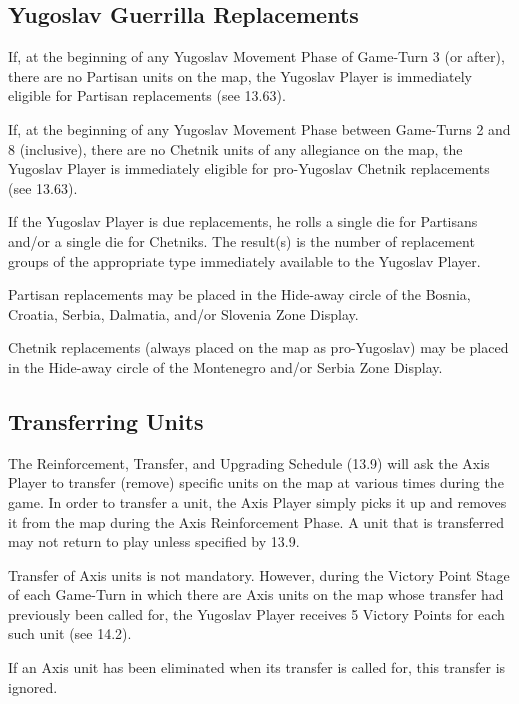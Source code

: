 \subsection{Yugoslav Guerrilla Replacements}\label{sec:13.6}

 If, at the beginning of any Yugoslav Movement Phase of Game-Turn 3 (or after), there are no Partisan units on the map, the Yugoslav Player is immediately eligible for Partisan replacements (see 13.63).

 If, at the beginning of any Yugoslav Movement Phase between Game-Turns 2 and 8 (inclusive), there are no Chetnik units of any allegiance on the map, the Yugoslav Player is immediately eligible for pro-Yugoslav Chetnik replacements (see 13.63).

 If the Yugoslav Player is due replacements, he rolls a single die for Partisans and/or a single die for Chetniks. The result(s) is the number of replacement groups of the appropriate type immediately available to the Yugoslav Player.

 Partisan replacements may be placed in the Hide-away circle of the
Bosnia, Croatia, Serbia, Dalmatia, and/or Slovenia Zone Display.

Chetnik replacements (always placed on the map as pro-Yugoslav) may be placed in the Hide-away circle of the Montenegro and/or Serbia Zone Display.

\subsection{Transferring Units}\label{sec:13.7}

 The Reinforcement, Transfer, and Upgrading Schedule (13.9) will ask the Axis Player to transfer (remove) specific units on the map at various times during the game. In order to transfer a unit, the Axis Player simply picks it up and removes it from the map during the Axis Reinforcement Phase. A unit that is transferred may not return to play unless specified by 13.9.

 Transfer of Axis units is not mandatory. However, during the Victory Point Stage of each Game-Turn in which there are Axis units on the map whose transfer had previously been called for, the Yugoslav Player receives 5 Victory Points for each such unit (see 14.2).

 If an Axis unit has been eliminated when its transfer is called for, this transfer is ignored.

